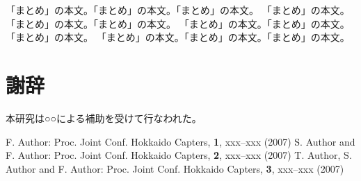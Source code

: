 \documentclass[a4j,10pt]{jarticle}
\begin{document}
「まとめ」の本文。「まとめ」の本文。「まとめ」の本文。
「まとめ」の本文。「まとめ」の本文。「まとめ」の本文。
「まとめ」の本文。「まとめ」の本文。「まとめ」の本文。
「まとめ」の本文。「まとめ」の本文。「まとめ」の本文。
\cite{1stPaper,2ndPaper,3rdPaper}

\section*{謝辞}

本研究は○○による補助を受けて行なわれた。

\begin{thebibliography}{0}
\setlength{\itemsep}{0mm}
\setlength{\baselineskip}{10pt}
\vspace{2mm}
 F. Author:
 Proc. Joint Conf. Hokkaido Capters, {\bf 1}, xxx--xxx (2007)
 S. Author and F. Author:
 Proc. Joint Conf. Hokkaido Capters, {\bf 2}, xxx--xxx (2007)
 T. Author, S. Author and F. Author:
 Proc. Joint Conf. Hokkaido Capters, {\bf 3}, xxx--xxx (2007)
\end{thebibliography}
\end{document}
